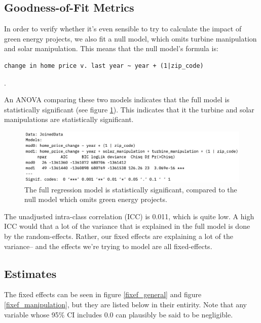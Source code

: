 \documentclass{article}
\begin{document}
\subsection{Goodness-of-Fit Metrics}
In order to verify whether it's even sensible to try to calculate the impact of green energy projects, we also fit a null model, which omits turbine manipulation and solar manipulation.
This means that the null model's formula is:
\begin{verbatim}
change in home price v. last year ~ year + (1|zip_code)
\end{verbatim}
.

An ANOVA comparing these two models indicates that the full model is statistically significant (see figure \ref{anova}).
This indicates that it the turbine and solar manipulations are statistically significant.

\begin{figure}[h]
\centering
\includegraphics[width=0.9\linewidth]
{lmer_mod_anova.jpg} 
\caption{The full regression model is statistically significant, compared to the null model which omits green energy projects.}
\label{anova}
\end{figure}

The unadjusted intra-class correlation (ICC) is 0.011, which is quite low.
A high ICC would that a lot of the variance that is explained in the full model is done by the random-effects.
Rather, our fixed effects are explaining a lot of the variance-- and the effects we're trying to model are all fixed-effects.

\subsection{Estimates}

The fixed effects can be seen in figure \ref{fixef_general} and figure \ref{fixef_manipulation}, but they are listed below in their entirity.
Note that any variable whose 95\% CI includes 0.0 can plausibly be said to be negligible.
\end{document}
